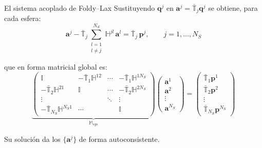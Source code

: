 \documentclass[aspectratio=43,11pt]{beamer}
\begin{document}
\begin{frame}{El sistema acoplado de Foldy--Lax}
  \vspace{4pt}
  \footnotesize
  Sustituyendo $\mathbf{q}^{j}$ en $\mathbf{a}^{j}=\bar{\mathbb{T}}_j\mathbf{q}^{j}$
  se obtiene, para cada esfera:
  \begin{equation*}
    \mathbf{a}^{j}
    - \bar{\mathbb{T}}_j \sum_{\substack{l=1\\l\neq j}}^{N_S}
      \mathbb{H}^{jl}\,\mathbf{a}^{l}
    = \bar{\mathbb{T}}_j\,\mathbf{p}^{j},
    \qquad j = 1,\ldots,N_S
  \end{equation*}
  \vspace{2pt}

  que en forma matricial global es:
  \begin{equation*}
    \underbrace{
    \begin{pmatrix}
      \mathbb{I}                          & -\bar{\mathbb{T}}_1\mathbb{H}^{12} & \cdots & -\bar{\mathbb{T}}_1\mathbb{H}^{1N_S} \\
      -\bar{\mathbb{T}}_2\mathbb{H}^{21}  & \mathbb{I}                         & \cdots & -\bar{\mathbb{T}}_2\mathbb{H}^{2N_S} \\
      \vdots                              &                                    & \ddots & \vdots                               \\
      -\bar{\mathbb{T}}_{N_S}\mathbb{H}^{N_S 1} & \cdots                       &        & \mathbb{I}
    \end{pmatrix}}_{\mathbb{M}_{sys}}
    \begin{pmatrix}\mathbf{a}^1\\\mathbf{a}^2\\\vdots\\\mathbf{a}^{N_S}\end{pmatrix}
    =
    \begin{pmatrix}
      \bar{\mathbb{T}}_1\mathbf{p}^1\\
      \bar{\mathbb{T}}_2\mathbf{p}^2\\
      \vdots\\
      \bar{\mathbb{T}}_{N_S}\mathbf{p}^{N_S}
    \end{pmatrix}
  \end{equation*}
  \vspace{2pt}
  \begin{center}
    {\color{pizarra2} Su solución da los $\{\mathbf{a}^{j}\}$ de forma autoconsistente.}
  \end{center}
\end{frame}
\end{document}
